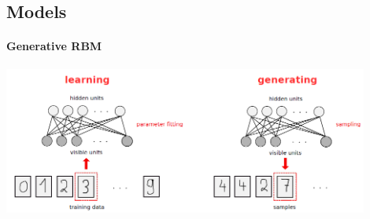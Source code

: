 \documentclass[a4paper]{scrartcl}
\begin{document}
\subsection{Models}
\paragraph{Generative RBM}
\begin{center}
\includegraphics[width=12cm]{images/generativeRBM.png}
\end{center}
\end{document}

